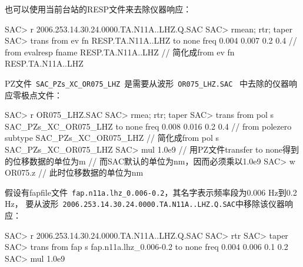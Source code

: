 也可以使用当前台站的RESP文件来去除仪器响应：
\begin{SACCode}
SAC> r 2006.253.14.30.24.0000.TA.N11A..LHZ.Q.SAC
SAC> rmean; rtr; taper
SAC> trans from ev fn RESP.TA.N11A..LHZ to none freq 0.004 0.007 0.2 0.4
    // from evalresp fname RESP.TA.N11A..LHZ
    // 简化成from ev fn RESP.TA.N11A..LHZ
\end{SACCode}

PZ文件~\verb+SAC_PZs_XC_OR075_LHZ+~是需要从波形~\verb+OR075_LHZ.SAC+~
中去除的仪器响应零极点文件：
\begin{SACCode}
SAC> r OR075_LHZ.SAC
SAC> rmea; rtr; taper
SAC> trans from pol s SAC_PZs_XC_OR075_LHZ to none freq 0.008 0.016 0.2 0.4
    // from polezero subtype SAC_PZs_XC_OR075_LHZ
    // 简化成from pol s SAC_PZs_XC_OR075_LHZ
SAC> mul 1.0e9      // 用PZ文件transfer to none得到的位移数据的单位为m
                    // 而SAC默认的单位为nm，因而必须乘以1.0e9
SAC> w OR075.z      // 此时位移数据的单位为nm
\end{SACCode}

假设有fapfile文件~\verb+fap.n11a.lhz_0.006-0.2+，其名字表示频率段为0.006 Hz到0.2 Hz，
要从波形~\verb+2006.253.14.30.24.0000.TA.N11A..LHZ.Q.SAC+中移除该仪器响应：
\begin{SACCode}
SAC> r 2006.253.14.30.24.0000.TA.N11A..LHZ.Q.SAC
SAC> rtr
SAC> taper
SAC> trans from fap s fap.n11a.lhz_0.006-0.2 to none freq 0.004 0.006 0.1 0.2
SAC> mul 1.0e9
\end{SACCode}

